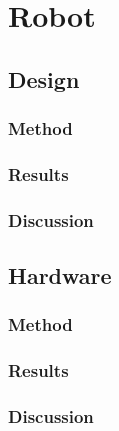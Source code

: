 \section{Robot}
    \subsection{Design}
        \subsubsection{Method}
        \subsubsection{Results}
        \subsubsection{Discussion}
    \subsection{Hardware}
        \subsubsection{Method}
        \subsubsection{Results}
        \subsubsection{Discussion}

